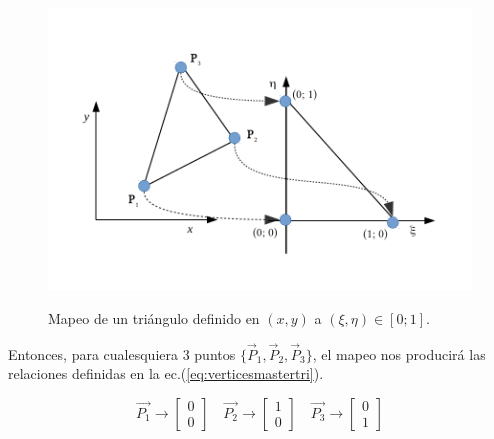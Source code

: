 \begin{figure}
\centering
\includegraphics[scale=.8]{Triangulo.pdf}
\caption{\label{fig:tri} } Mapeo de un triángulo definido en $(x,y)$ a $(\xi, \eta) \in [0; 1]$.
\end{figure}

 Entonces, para cualesquiera 3 puntos $ \lbrace \vec{P}_{1}, \vec{P}_{2}, \vec{P}_{3}  \rbrace $, el mapeo nos producirá las relaciones definidas en la ec.(\ref{eq:verticesmastertri}).

\begin{equation}
  \label{eq:verticesmastertri}
  \vec{P_1} \rightarrow 
  \begin{bmatrix}
    0\\ 
    0
  \end{bmatrix}\quad \vec{P_2} \rightarrow
  \begin{bmatrix}
    1\\
    0
  \end{bmatrix}\quad \vec{P_3} \rightarrow
  \begin{bmatrix}
    0\\
    1
  \end{bmatrix}
\end{equation}

